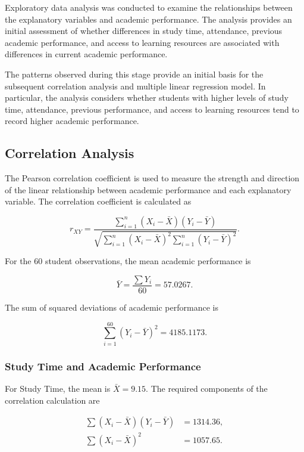 Exploratory data analysis was conducted to examine the relationships between the explanatory variables and academic performance. The analysis provides an initial assessment of whether differences in study time, attendance, previous academic performance, and access to learning resources are associated with differences in current academic performance.

The patterns observed during this stage provide an initial basis for the subsequent correlation analysis and multiple linear regression model. In particular, the analysis considers whether students with higher levels of study time, attendance, previous performance, and access to learning resources tend to record higher academic performance.

\subsection{Correlation Analysis}

The Pearson correlation coefficient is used to measure the strength and direction of the linear relationship between academic performance and each explanatory variable. The correlation coefficient is calculated as

\begin{equation}
r_{XY} =
\frac{\sum_{i=1}^{n}(X_i-\bar{X})(Y_i-\bar{Y})}
{\sqrt{\sum_{i=1}^{n}(X_i-\bar{X})^2
\sum_{i=1}^{n}(Y_i-\bar{Y})^2}}.
\end{equation}

For the 60 student observations, the mean academic performance is

\begin{equation}
\bar{Y} = \frac{\sum Y_i}{60} = 57.0267.
\end{equation}

The sum of squared deviations of academic performance is

\begin{equation}
\sum_{i=1}^{60}(Y_i-\bar{Y})^2 = 4185.1173.
\end{equation}

\subsubsection{Study Time and Academic Performance}

For Study Time, the mean is $\bar{X}=9.15$. The required components of the correlation calculation are

\begin{align*}
\sum(X_i-\bar{X})(Y_i-\bar{Y}) &= 1314.36,\\
\sum(X_i-\bar{X})^2 &= 1057.65.
\end{align*}

